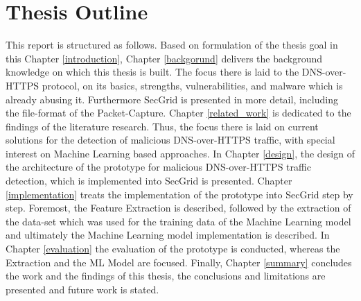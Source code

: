 \section{Thesis Outline} \label{outline}
This report is structured as follows. Based on formulation of the thesis goal in this Chapter \ref{introduction}, Chapter \ref{backgorund} delivers the background knowledge on which this thesis is built. The focus there is laid to the DNS-over-HTTPS protocol, on its basics, strengths, vulnerabilities, and malware which is already abusing it. Furthermore SecGrid is presented in more detail, including the file-format of the Packet-Capture. Chapter \ref{related_work} is dedicated to the findings of the literature research. Thus, the focus there is laid on current solutions for the detection of malicious DNS-over-HTTPS traffic, with special interest on Machine Learning based approaches. In Chapter \ref{design}, the design of the architecture of the prototype for malicious DNS-over-HTTPS traffic detection, which is implemented into SecGrid is presented. Chapter \ref{implementation} treats the implementation of the prototype into SecGrid step by step. Foremost, the Feature Extraction is described, followed by the extraction of the data-set which was used for the training data of the Machine Learning model and ultimately the Machine Learning model implementation is described. In Chapter \ref{evaluation} the evaluation of the prototype is conducted, whereas the Extraction and the ML Model are focused. Finally, Chapter \ref{summary} concludes the work and the findings of this thesis, the conclusions and limitations are presented and future work is stated.

